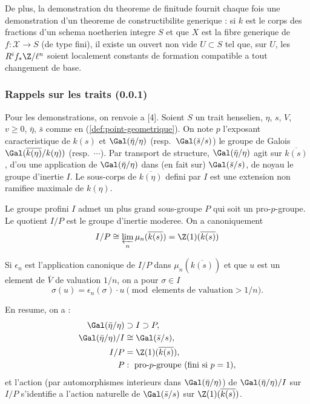 De plus, la demonstration du theoreme de finitude fournit chaque fois une demonstration d'un theoreme de constructibilite generique : si $k$ est le corps des fractions d'un schema noetherien integre $S$ et que $X$ est la fibre generique de $f: \mathcal{X} \to S$ (de type fini), il existe un ouvert non vide $U \subset S$ tel que, sur $U$, les $R^i f_* \Z/\ell^n$ soient localement constants de formation compatible a tout changement de base.

\subsubsection{Rappels sur les traits (0.0.1)}
\label{subsubsec:rappels-traits}

Pour les demonstrations, on renvoie a [4]. Soient $S$ un trait henselien, $\eta$, $s$, $V$, $v \geqslant 0$, $\bar{\eta}$, $\bar{s}$ comme en (\ref{def:point-geometrique}). On note $p$ l'exposant caracteristique de $k(s)$ et $\Gal(\bar{\eta}/\eta)$ (resp.~$\Gal(\bar{s}/s)$) le groupe de Galois $\Gal(\overline{k(\eta)}/k(\eta))$ (resp.~$\cdots$). Par transport de structure, $\Gal(\bar{\eta}/\eta)$ agit sur $\overline{k(s)}$, d'ou une application de $\Gal(\bar{\eta}/\eta)$ dans (en fait sur) $\Gal(\bar{s}/s)$, de noyau le groupe d'inertie $I$. Le sous-corps de $\overline{k(\eta)}$ defini par $I$ est une extension non ramifiee maximale de $k(\eta)$.

Le groupe profini $I$ admet un plus grand sous-groupe $P$ qui soit un pro-$p$-groupe. Le quotient $I/P$ est le groupe d'inertie moderee. On a canoniquement
\[
I/P \cong \varprojlim_n \mu_n(\overline{k(s)}) = \Z(1)(\overline{k(s)})
\]

Si $\epsilon_n$ est l'application canonique de $I/P$ dans $\mu_n(\overline{k(s)})$ et que $u$ est un element de $\bar{V}$ de valuation $1/n$, on a pour $\sigma \in I$
\[
\sigma(u) = \epsilon_n(\sigma) \cdot u \pmod{\text{elements de valuation} > 1/n} .
\]

En resume, on a :
\begin{equation}
\label{eq:inertie}
\begin{aligned}
\Gal(\bar{\eta}/\eta) &\supset I \supset P, \\
\Gal(\bar{\eta}/\eta)/I &\cong \Gal(\bar{s}/s), \\
I/P &= \Z(1)(\overline{k(s)}), \\
P &: \text{ pro-$p$-groupe (fini si $p=1$)},
\end{aligned}
\end{equation}
et l'action (par automorphismes interieurs dans $\Gal(\bar{\eta}/\eta)$) de $\Gal(\bar{\eta}/\eta)/I$ sur $I/P$ s'identifie a l'action naturelle de $\Gal(\bar{s}/s)$ sur $\Z(1)(\overline{k(s)})$.

